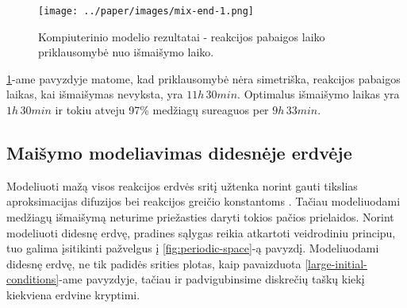 \begin{figure}[h!]
    \centering
    \texttt{[image: ../paper/images/mix-end-1.png]}

    \caption{Kompiuterinio modelio rezultatai - reakcijos pabaigos laiko priklausomybė nuo išmaišymo laiko. }

    \label{mix-end}
\end{figure}

\ref{mix-end}-ame pavyzdyje matome, kad priklausomybė nėra simetriška, reakcijos pabaigos laikas, kai išmaišymas nevyksta, yra $11h\, 30min$. Optimalus išmaišymo laikas yra $1h\, 30min$ ir tokiu atveju 97\% medžiagų sureaguos per $9h\,33min$.

\subsection{Maišymo modeliavimas didesnėje erdvėje}

Modeliuoti mažą visos reakcijos erdvės sritį užtenka norint gauti tikslias aproksimacijas difuzijos bei reakcijos greičio konstantoms \cite{mackeviciusCloserLookComputer2012}. Tačiau modeliuodami medžiagų išmaišymą neturime priežasties daryti tokios pačios prielaidos. Norint modeliuoti didesnę erdvę, pradines sąlygas reikia atkartoti veidrodiniu principu, tuo galima įsitikinti pažvelgus į \ref{fig:periodic-space}-ą pavyzdį. Modeliuodami didesnę erdvę, ne tik padidės srities plotas, kaip pavaizduota \ref{large-initial-conditions}-ame pavyzdyje, tačiau ir padvigubinsime diskrečių taškų kiekį kiekviena erdvine kryptimi.


